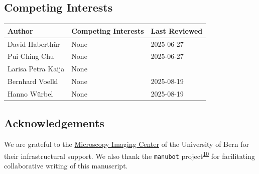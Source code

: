 \hypertarget{competing-interests}{%
\subsection{Competing Interests}\label{competing-interests}}

\begin{tablenos:no-prefix-table-caption}

\begin{longtable}[]{@{}lll@{}}
\toprule()
Author & Competing Interests & Last Reviewed \\
\midrule()
\endhead
David Haberthür & None & 2025-06-27 \\
Pui Ching Chu & None & 2025-06-27 \\
Larisa Petra Kaija & None & \\
Bernhard Voelkl & None & 2025-08-19 \\
Hanno Würbel & None & 2025-08-19 \\
\bottomrule()
\end{longtable}

\end{tablenos:no-prefix-table-caption}

\hypertarget{acknowledgements}{%
\subsection{Acknowledgements}\label{acknowledgements}}

We are grateful to the \href{https://mic.unibe.ch/}{Microscopy Imaging Center} of the University of Bern for their infrastructural support.
We also thank the \texttt{manubot} project\textsuperscript{\protect\hyperlink{ref-YuJbg3zO}{10}} for facilitating collaborative writing of this manuscript.
